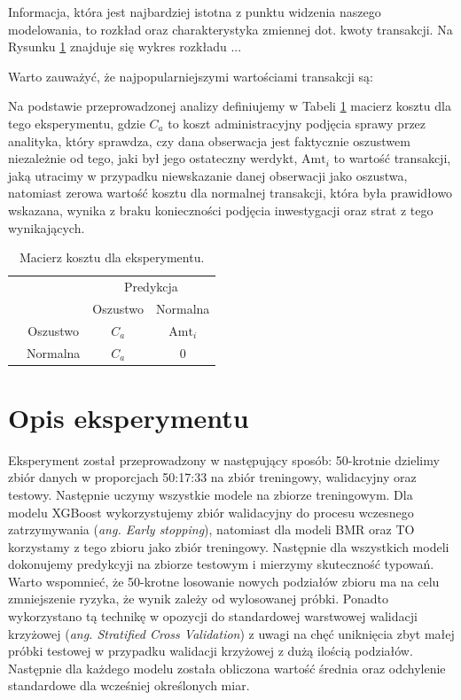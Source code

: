 \documentclass[inzynierska]{pwr_wmat_praca_dyplomowa}
\theoremstyle{plain}
\numberwithin{theorem}{chapter}
\theoremstyle{definition}
\numberwithin{theorem}{chapter}
\begin{document}
Informacja, która jest najbardziej istotna z punktu widzenia naszego modelowania, to rozkład oraz charakterystyka zmiennej dot. kwoty transakcji. Na Rysunku \ref{} znajduje się wykres rozkładu ... 

Warto zauważyć, że najpopularniejszymi wartościami transakcji są: 

Na podstawie przeprowadzonej analizy definiujemy w Tabeli \ref{macierz-kosztu-eksperyment} macierz kosztu dla tego eksperymentu, gdzie $C_a$ to koszt administracyjny podjęcia sprawy przez analityka, który sprawdza, czy dana obserwacja jest faktycznie oszustwem niezależnie od tego, jaki był jego ostateczny werdykt, $\text{Amt}_i$ to wartość transakcji, jaką utracimy w przypadku niewskazanie danej obserwacji jako oszustwa, natomiast zerowa wartość kosztu dla normalnej transakcji, która była prawidłowo wskazana, wynika z braku konieczności podjęcia inwestygacji oraz strat z tego wynikających.

\begin{table}[h]
	\begin{center}
		\makegapedcells
		\begin{tabular}{cc|cc}
			\multicolumn{2}{c}{}     &   \multicolumn{2}{c}{Predykcja} \\
			&            &   Oszustwo &   Normalna     \\ 
			\cline{2-4}
			\multirow{2}{*}{\rotatebox[origin=c]{90}{Prawda}} & Oszustwo   & $C_a$         & $\text{Amt}_i$              \\
			& Normalna   & $C_a$         & $0$              \\ 
			\cline{2-4}
		\end{tabular}
	\end{center}
	\caption{Macierz kosztu dla eksperymentu.}
	\label{macierz-kosztu-eksperyment}
\end{table}

\section{Opis eksperymentu}
Eksperyment został przeprowadzony w następujący sposób:
50-krotnie dzielimy zbiór danych w proporcjach 50:17:33 na zbiór treningowy, walidacyjny oraz testowy. Następnie uczymy wszystkie modele na zbiorze treningowym. Dla modelu XGBoost wykorzystujemy zbiór walidacyjny do procesu wczesnego zatrzymywania (\textit{ang. Early stopping}), natomiast dla modeli BMR oraz TO korzystamy z tego zbioru jako zbiór treningowy. Następnie dla wszystkich modeli dokonujemy predykcyji na zbiorze testowym i mierzymy skuteczność typowań. Warto wspomnieć, że 50-krotne losowanie nowych podziałów zbioru ma na celu zmniejszenie ryzyka, że wynik zależy od wylosowanej próbki. Ponadto wykorzystano tą technikę w opozycji do standardowej warstwowej walidacji krzyżowej (\textit{ang. Stratified Cross Validation}) z uwagi na chęć uniknięcia zbyt małej próbki testowej w przypadku walidacji krzyżowej z dużą ilością podziałów. Następnie dla każdego modelu została obliczona wartość średnia oraz odchylenie standardowe dla wcześniej określonych miar.
\end{document}
